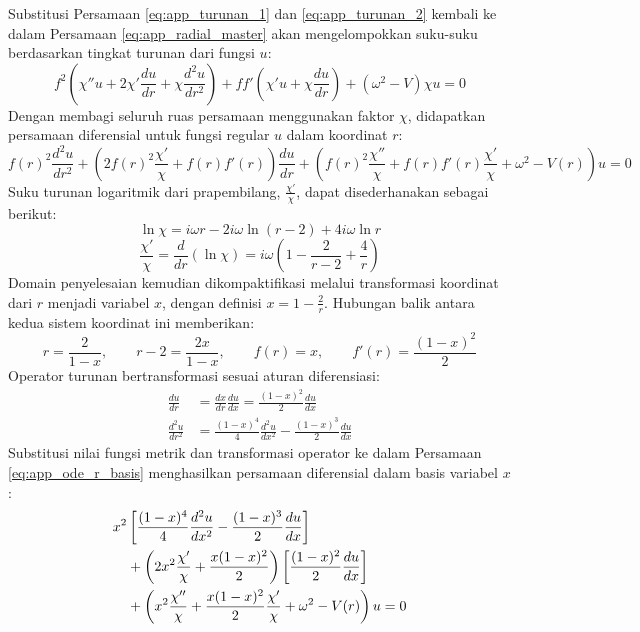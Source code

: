 Substitusi Persamaan \eqref{eq:app_turunan_1} dan \eqref{eq:app_turunan_2} kembali ke dalam Persamaan \eqref{eq:app_radial_master} akan mengelompokkan suku-suku berdasarkan tingkat turunan dari fungsi $u$:
\begin{equation}
    f^2 \left( \chi'' u + 2\chi' \frac{du}{dr} + \chi \frac{d^2u}{dr^2} \right) + f f' \left( \chi' u + \chi \frac{du}{dr} \right) + (\omega^2 - V)\chi u = 0
\end{equation}
Dengan membagi seluruh ruas persamaan menggunakan faktor $\chi$, didapatkan persamaan diferensial untuk fungsi regular $u$ dalam koordinat $r$:
\begin{equation}
    f(r)^2 \frac{d^2u}{dr^2} + \left( 2f(r)^2 \frac{\chi'}{\chi} + f(r)f'(r) \right) \frac{du}{dr} + \left( f(r)^2 \frac{\chi''}{\chi} + f(r)f'(r) \frac{\chi'}{\chi} + \omega^2 - V(r) \right) u = 0 \label{eq:app_ode_r_basis}
\end{equation}
Suku turunan logaritmik dari prapembilang, $\frac{\chi'}{\chi}$, dapat disederhanakan sebagai berikut:
\begin{equation}
    \ln \chi = i\omega r - 2i\omega \ln(r-2) + 4i\omega \ln r
\end{equation}
\begin{equation}
    \frac{\chi'}{\chi} = \frac{d}{dr}(\ln \chi) = i\omega \left( 1 - \frac{2}{r-2} + \frac{4}{r} \right)
\end{equation}
Domain penyelesaian kemudian dikompaktifikasi melalui transformasi koordinat dari $r$ menjadi variabel $x$, dengan definisi $x = 1 - \frac{2}{r}$. Hubungan balik antara kedua sistem koordinat ini memberikan:
\begin{equation}
    r = \frac{2}{1-x}, \qquad r-2 = \frac{2x}{1-x}, \qquad f(r) = x, \qquad f'(r) = \frac{(1-x)^2}{2}
\end{equation}
Operator turunan bertransformasi sesuai aturan diferensiasi:
\begin{align}
    \frac{du}{dr} &= \frac{dx}{dr} \frac{du}{dx} = \frac{(1-x)^2}{2} \frac{du}{dx} \\
    \frac{d^2u}{dr^2} &= \frac{(1-x)^4}{4} \frac{d^2u}{dx^2} - \frac{(1-x)^3}{2} \frac{du}{dx}
\end{align}
Substitusi nilai fungsi metrik dan transformasi operator ke dalam Persamaan \eqref{eq:app_ode_r_basis} menghasilkan persamaan diferensial dalam basis variabel $x$:
\begin{align}
    x^2 &\left[ \frac{(1-x)^4}{4} \frac{d^2u}{dx^2} - \frac{(1-x)^3}{2} \frac{du}{dx} \right] \notag \\
    &+ \left( 2x^2 \frac{\chi'}{\chi} + \frac{x(1-x)^2}{2} \right) \left[ \frac{(1-x)^2}{2} \frac{du}{dx} \right] \notag \\
    &+ \left( x^2 \frac{\chi''}{\chi} + \frac{x(1-x)^2}{2} \frac{\chi'}{\chi} + \omega^2 - V(r) \right) u = 0
\end{align}

